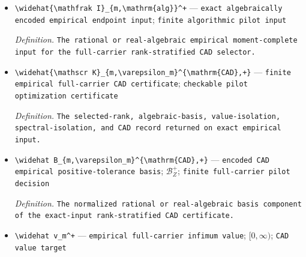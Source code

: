 \documentclass{article}
\begin{document}
\begin{itemize}
  \par\smallskip\noindent\emph{Definition.} The first countable-enumeration class whose empirical loss is within \(\varepsilon_m\) of the countable infimum; it is a set-theoretic measurable existence selector, not a finite evaluation algorithm.
  \item \texttt{\textbackslash{}\allowbreak{}widehat\{\textbackslash{}\allowbreak{}mathfrak I\}\allowbreak{}\_\allowbreak{}\{m,\allowbreak{}\textbackslash{}\allowbreak{}mathrm\{alg\}\allowbreak{}\}\allowbreak{}\textasciicircum{}+\allowbreak{}} --- \texttt{exact algebraically encoded empirical endpoint input}; \texttt{finite algorithmic pilot input}
  \par\smallskip\noindent\emph{Definition.} \texttt{The rational or real-\allowbreak{}algebraic empirical moment-\allowbreak{}complete input for the full-\allowbreak{}carrier rank-\allowbreak{}stratified CAD selector.}
  \item \texttt{\textbackslash{}\allowbreak{}widehat\{\textbackslash{}\allowbreak{}mathscr K\}\allowbreak{}\_\allowbreak{}\{m,\allowbreak{}\textbackslash{}\allowbreak{}varepsilon\_\allowbreak{}m\}\allowbreak{}\textasciicircum{}\{\textbackslash{}\allowbreak{}mathrm\{CAD\}\allowbreak{},\allowbreak{}+\allowbreak{}\}\allowbreak{}} --- \texttt{finite empirical full-\allowbreak{}carrier CAD certificate}; \texttt{checkable pilot optimization certificate}
  \par\smallskip\noindent\emph{Definition.} \texttt{The selected-\allowbreak{}rank,\allowbreak{} algebraic-\allowbreak{}basis,\allowbreak{} value-\allowbreak{}isolation,\allowbreak{} spectral-\allowbreak{}isolation,\allowbreak{} and CAD record returned on exact empirical input.}
  \item \texttt{\textbackslash{}\allowbreak{}widehat B\_\allowbreak{}\{m,\allowbreak{}\textbackslash{}\allowbreak{}varepsilon\_\allowbreak{}m\}\allowbreak{}\textasciicircum{}\{\textbackslash{}\allowbreak{}mathrm\{CAD\}\allowbreak{},\allowbreak{}+\allowbreak{}\}\allowbreak{}} --- \texttt{encoded CAD empirical positive-\allowbreak{}tolerance basis}; \(\mathcal B_Z^+\); \texttt{finite full-\allowbreak{}carrier pilot decision}
  \par\smallskip\noindent\emph{Definition.} \texttt{The normalized rational or real-\allowbreak{}algebraic basis component of the exact-\allowbreak{}input rank-\allowbreak{}stratified CAD certificate.}
  \item \texttt{\textbackslash{}\allowbreak{}widehat v\_\allowbreak{}m\textasciicircum{}+\allowbreak{}} --- \texttt{empirical full-\allowbreak{}carrier infimum value}; \([0,\infty)\); \texttt{CAD value target}

\end{itemize}
\end{document}
